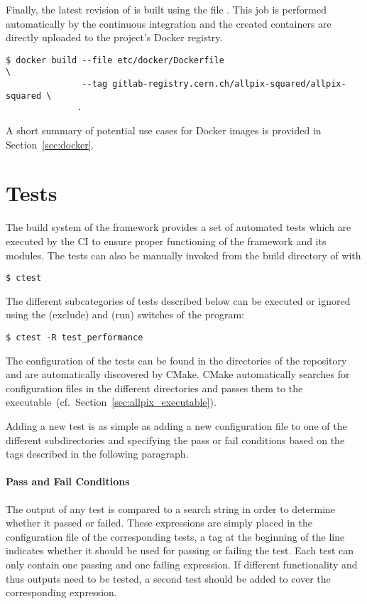 Finally, the latest revision of \apsq is built using the file .
This job is performed automatically by the continuous integration and the created containers are directly uploaded to the project's Docker registry.
\begin{verbatim}
$ docker build --file etc/docker/Dockerfile                                \
               --tag gitlab-registry.cern.ch/allpix-squared/allpix-squared \
              .
\end{verbatim}

A short summary of potential use cases for Docker images is provided in Section~\ref{sec:docker}.

\section{Tests}
\label{sec:tests}

The build system of the framework provides a set of automated tests which are executed by the CI to ensure proper functioning of the framework and its modules.
The tests can also be manually invoked from the build directory of \apsq with
\begin{verbatim}
$ ctest
\end{verbatim}

The different subcategories of tests described below can be executed or ignored using the  (exclude) and  (run) switches of the  program:
\begin{verbatim}
$ ctest -R test_performance
\end{verbatim}

The configuration of the tests can be found in the  directories of the repository and are automatically discovered by CMake.
CMake automatically searches for \apsq configuration files in the different directories and passes them to the \apsq executable~(cf.\ Section~\ref{sec:allpix_executable}).

Adding a new test is as simple as adding a new configuration file to one of the different subdirectories and specifying the pass or fail conditions based on the tags described in the following paragraph.

\paragraph{Pass and Fail Conditions}

The output of any test is compared to a search string in order to determine whether it passed or failed.
These expressions are simply placed in the configuration file of the corresponding tests, a tag at the beginning of the line indicates whether it should be used for passing or failing the test.
Each test can only contain one passing and one failing expression.
If different functionality and thus outputs need to be tested, a second test should be added to cover the corresponding expression.

